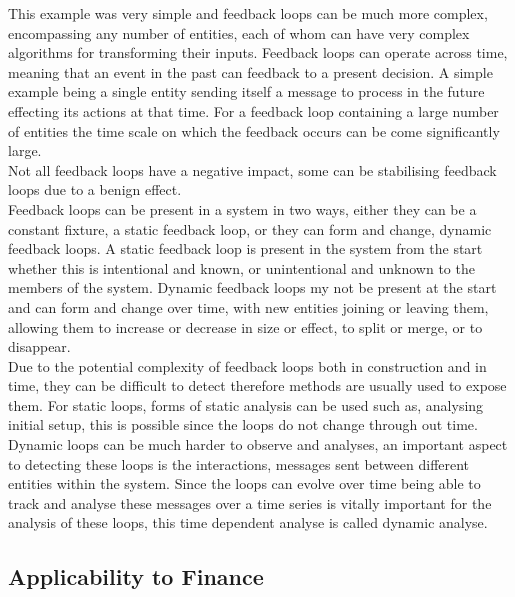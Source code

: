 \documentclass{article}
\begin{document}
This example was very simple and feedback loops can be much more complex, encompassing any number of entities, each of whom can have very complex algorithms for transforming their inputs. Feedback loops can operate across time, meaning that an event in the past can feedback to a present decision. A simple example being a single entity sending itself a message to process in the future effecting its actions at that time. For a feedback loop containing a large number of entities the time scale on which the feedback occurs can be come significantly large.\\
Not all feedback loops have a negative impact, some can be stabilising feedback loops due to a benign effect.\\ 
Feedback loops can be present in a system in two ways, either they can be a constant fixture, a static feedback loop, or they can form and change, dynamic feedback loops. A static feedback loop is present in the system from the start whether this is intentional and known, or unintentional and unknown to the members of the system. Dynamic feedback loops my not be present at the start and can form and change over time, with new entities joining or leaving them, allowing them to increase or decrease in size or effect, to split or merge, or to disappear.\\
Due to the potential complexity of feedback loops both in construction and in time, they can be difficult to detect therefore methods are usually used to expose them. For static loops, forms of static analysis can be used such as, analysing initial setup, this is possible since the loops do not change through out time. Dynamic loops can be much harder to observe and analyses, an important aspect to detecting these loops is the interactions, messages sent between different entities within the system. Since the loops can evolve over time being able to track and analyse these messages over a time series is vitally important for the analysis of these loops, this time dependent analyse is called dynamic analyse.  




\subsection{Applicability to Finance}
\end{document}
